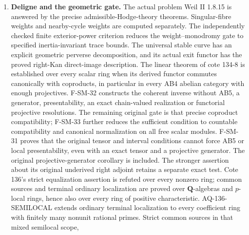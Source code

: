 \documentclass[11pt,a4paper]{article}
\theoremstyle{definition}\newtheorem{definition}[theorem]{Definition}
\theoremstyle{remark}\newtheorem{remark}[theorem]{Remark}
\begin{document}
\begin{enumerate}
classified in every simple complex adjoint type, with exact finite
quotients and orbit counts. Outer-invariant classes exist exactly
outside the even-rank A types. Opposite choices exist in every type;
the all-choice criterion is now fully determined in every simple type.
Besides the stated classical positive cases, it holds in $G_2$; it
fails in $F_4,E_6,E_7,E_8$, with complete exceptional counterexamples.
The recovered cote 18 comparison list has precisely scoped classical
Betti, de Rham, crystalline and integral $p$-adic answers.
Its adelic genericity assertion on physical page 49/footer 48 is
proved by the short deduction BR-18-AD01 from exact local results.
Cote 66's named affine torsion-coefficient comparison cases are
affirmative; its universal degree-zero test is exactly henselianity.
\item \textbf{Deligne and the geometric gate.} The actual problem
Weil II 1.8.15 is answered by the precise admissible-Hodge-theory
theorems. Singular-fibre weights and nearby-cycle weights are computed
separately. The independently checked finite exterior-power criterion reduces the weight--monodromy gate to specified
inertia-invariant trace bounds. The universal stable curve has an explicit
geometric perverse decomposition, and its actual exit functor has the
proved right-Kan direct-image description. The linear theorem of cote
134-8 is established over every scalar ring when its derived functor
commutes canonically with coproducts, in particular in every AB4
abelian category with enough projectives. F-SM-32 constructs the
coherent inverse without AB5, a generator, presentability, an exact
chain-valued realization or functorial projective resolutions. The
remaining original gate is that precise coproduct compatibility;
F-SM-33 further reduces the sufficient condition to countable
compatibility and canonical normalization on all free scalar modules.
F-SM-31 proves that the original tensor and interval conditions cannot
force AB5 or local presentability, even with an exact tensor and a
projective generator. The original projective-generator
corollary is included. The stronger assertion about its original
underived right adjoint retains a separate exact test. Cote 136's
strict equalization assertion is refuted over every nonzero ring;
common sources and terminal ordinary localization are proved over
$\mathbf Q$-algebras and $p$-local rings, hence also over every ring
of positive characteristic. AQ-136-SEMILOCAL extends ordinary terminal
localization to every coefficient ring with finitely many nonunit
rational primes. Strict common sources in that mixed semilocal scope,

\end{enumerate}
\end{document}
